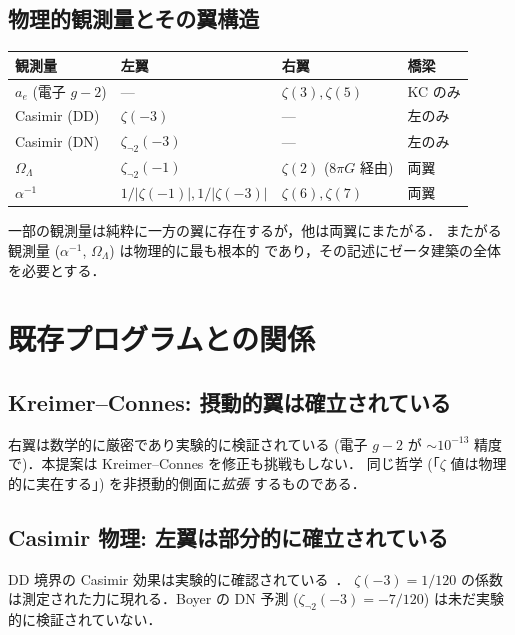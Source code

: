 \documentclass[11pt,a4paper]{article}
\begin{document}
\subsection{物理的観測量とその翼構造}

\begin{center}
\begin{tabular}{llll}
\toprule
観測量 & 左翼 & 右翼 & 橋梁 \\
\midrule
$a_e$ (電子 $g-2$) & --- & $\zeta(3), \zeta(5)$ & KC のみ \\
Casimir (DD) & $\zeta(-3)$ & --- & 左のみ \\
Casimir (DN) & $\zeta_{\neg 2}(-3)$ & --- & 左のみ \\
$\Omega_\Lambda$ & $\zeta_{\neg 2}(-1)$ & $\zeta(2)$ ($8\pi G$ 経由) & 両翼 \\
$\alpha^{-1}$ & $1/|\zeta(-1)|, 1/|\zeta(-3)|$ & $\zeta(6), \zeta(7)$ & 両翼 \\
\bottomrule
\end{tabular}
\end{center}

一部の観測量は純粋に一方の翼に存在するが，他は両翼にまたがる．
またがる観測量 ($\alpha^{-1}$, $\Omega_\Lambda$) は物理的に最も根本的
であり，その記述にゼータ建築の全体を必要とする．

\section{既存プログラムとの関係}

\subsection{Kreimer--Connes: 摂動的翼は確立されている}

右翼は数学的に厳密であり実験的に検証されている (電子 $g-2$ が
$\sim 10^{-13}$ 精度で)．本提案は Kreimer--Connes を修正も挑戦もしない．
同じ哲学 (「$\zeta$ 値は物理的に実在する」) を非摂動的側面に\emph{拡張}
するものである．

\subsection{Casimir 物理: 左翼は部分的に確立されている}

DD 境界の Casimir 効果は実験的に確認されている~\cite{Lamoreaux1997}．
$\zeta(-3) = 1/120$ の係数は測定された力に現れる．Boyer の DN 予測
($\zeta_{\neg 2}(-3) = -7/120$) は未だ実験的に検証されていない．
\end{document}
